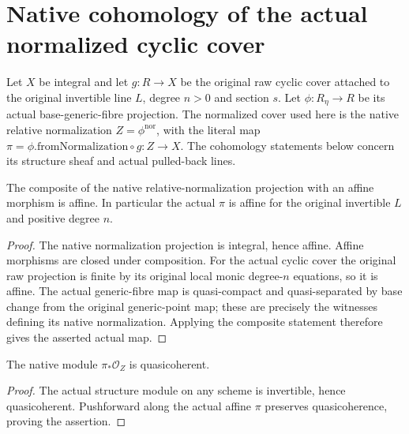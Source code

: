 \section{Native cohomology of the actual normalized cyclic cover}

Let $X$ be integral and let $g:R\to X$ be the original raw cyclic
cover attached to the original invertible line $L$, degree $n>0$
and section $s$.  Let
$\phi:R_\eta\to R$ be its actual base-generic-fibre projection.
The normalized cover used here is the native relative normalization
$Z=\phi^{\mathrm{nor}}$, with the literal map
$\pi=\phi.\mathrm{fromNormalization}\circ g:Z\to X$.
The cohomology statements below concern its structure sheaf and
actual pulled-back lines.

\begin{lemma}
\label{lem:kn-normalized-projection-affine}
\leanok
The composite of the native relative-normalization projection with
an affine morphism is affine.  In particular the actual $\pi$ is
affine for the original invertible $L$ and positive degree $n$.
\end{lemma}
\begin{proof}
The native normalization projection is integral, hence affine.
Affine morphisms are closed under composition.  For the actual
cyclic cover the original raw projection is finite by its original
local monic degree-$n$ equations, so it is affine.  The actual
generic-fibre map is quasi-compact and quasi-separated by base
change from the original generic-point map; these are precisely
the witnesses defining its native normalization.  Applying the
composite statement therefore gives the asserted actual map.
\end{proof}

\begin{lemma}
\label{lem:kn-normalized-structure-quasicoherent}
\leanok
{}
The native module $\pi_*\mathcal O_Z$ is quasicoherent.
\end{lemma}
\begin{proof}
The actual structure module on any scheme is invertible, hence
quasicoherent.  Pushforward along the actual affine $\pi$ preserves
quasicoherence, proving the assertion.
\end{proof}

